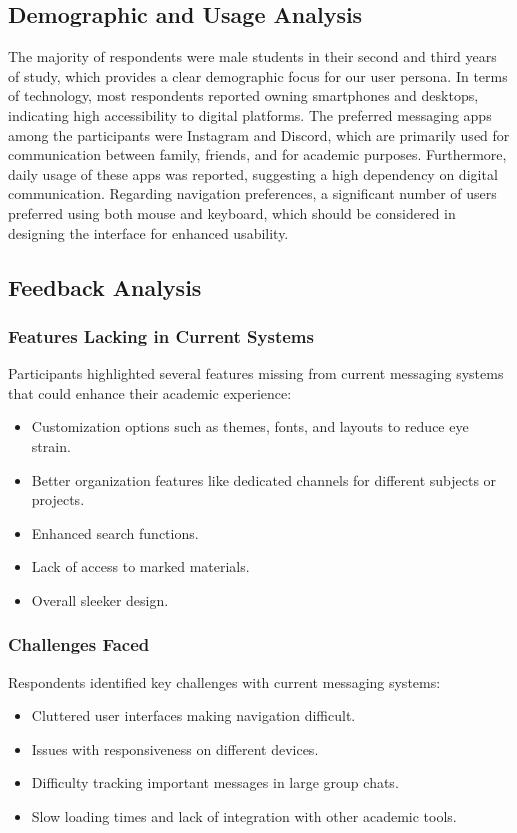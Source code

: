 \documentclass[12pt,a4paper]{article}
\begin{document}
\subsection*{Demographic and Usage Analysis}
The majority of respondents were male students in their second and third years of study, which provides a clear demographic focus for our user persona. In terms of technology, most respondents reported owning smartphones and desktops, indicating high accessibility to digital platforms. The preferred messaging apps among the participants were Instagram and Discord, which are primarily used for communication between family, friends, and for academic purposes. Furthermore, daily usage of these apps was reported, suggesting a high dependency on digital communication. Regarding navigation preferences, a significant number of users preferred using both mouse and keyboard, which should be considered in designing the interface for enhanced usability.

\subsection*{Feedback Analysis}
\subsubsection*{Features Lacking in Current Systems}
Participants highlighted several features missing from current messaging systems that could enhance their academic experience:
\begin{itemize}
    \item Customization options such as themes, fonts, and layouts to reduce eye strain.
    \item Better organization features like dedicated channels for different subjects or projects.
    \item Enhanced search functions.
    \item Lack of access to marked materials.
    \item Overall sleeker design.
\end{itemize}

\subsubsection*{Challenges Faced}
Respondents identified key challenges with current messaging systems:
\begin{itemize}
    \item Cluttered user interfaces making navigation difficult.
    \item Issues with responsiveness on different devices.
    \item Difficulty tracking important messages in large group chats.
    \item Slow loading times and lack of integration with other academic tools.
\end{itemize}
\end{document}
